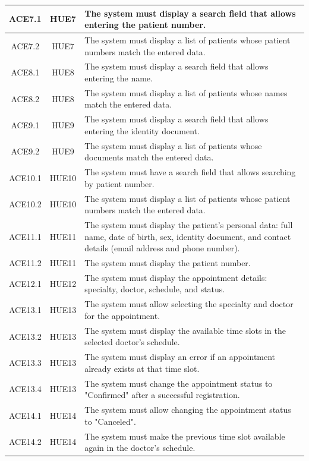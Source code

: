 \documentclass{prgrado}
\begin{document}
\begin{longtable}{|c|c|p{9cm}|}
ACE7.1 & HUE7 & The system must display a search field that allows entering the patient number. \\ \hline
ACE7.2 & HUE7 & The system must display a list of patients whose patient numbers match the entered data. \\ \hline

ACE8.1 & HUE8 & The system must display a search field that allows entering the name. \\ \hline
ACE8.2 & HUE8 & The system must display a list of patients whose names match the entered data. \\ \hline

ACE9.1 & HUE9 & The system must display a search field that allows entering the identity document. \\ \hline
ACE9.2 & HUE9 & The system must display a list of patients whose documents match the entered data. \\ \hline

ACE10.1 & HUE10 & The system must have a search field that allows searching by patient number. \\ \hline
ACE10.2 & HUE10 & The system must display a list of patients whose patient numbers match the entered data. \\ \hline

ACE11.1 & HUE11 & The system must display the patient's personal data: full name, date of birth, sex, identity document, and contact details (email address and phone number). \\ \hline
ACE11.2 & HUE11 & The system must display the patient number. \\ \hline

ACE12.1 & HUE12 & The system must display the appointment details: specialty, doctor, schedule, and status. \\ \hline

ACE13.1 & HUE13 & The system must allow selecting the specialty and doctor for the appointment. \\ \hline
ACE13.2 & HUE13 & The system must display the available time slots in the selected doctor's schedule. \\ \hline
ACE13.3 & HUE13 & The system must display an error if an appointment already exists at that time slot. \\ \hline
ACE13.4 & HUE13 & The system must change the appointment status to "Confirmed" after a successful registration. \\ \hline

ACE14.1 & HUE14 & The system must allow changing the appointment status to "Canceled". \\ \hline
ACE14.2 & HUE14 & The system must make the previous time slot available again in the doctor's schedule. \\ \hline


\end{longtable}
\end{document}
